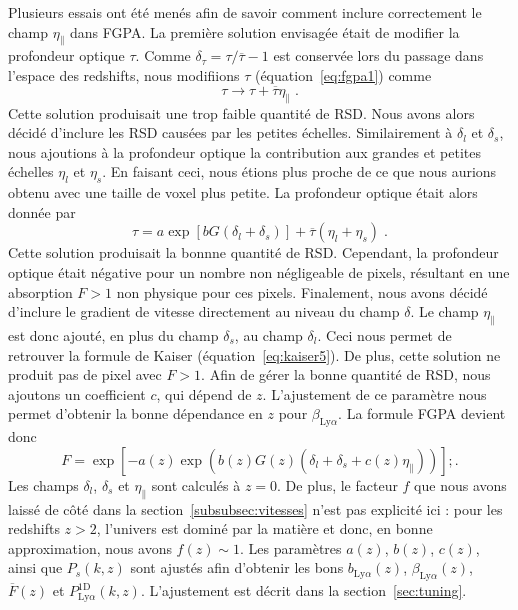 Plusieurs essais ont été menés afin de savoir comment inclure correctement le champ $\eta_{\parallel}$ dans FGPA.
La première solution envisagée était de modifier la profondeur optique $\tau$. Comme $\delta_{\tau} = \tau / \overline \tau - 1$ est conservée lors du passage dans l'espace des redshifts, nous modifiions $\tau$ (équation~\ref{eq:fgpa1}) comme
\begin{equation}
  \tau \rightarrow \tau + \overline \tau \eta_{\parallel} \; .
\end{equation}
Cette solution produisait une trop faible quantité de RSD. Nous avons alors décidé d'inclure les RSD causées par les petites échelles. Similairement à $\delta_l$ et $\delta_s$, nous ajoutions à la profondeur optique la contribution aux grandes et petites échelles $\eta_l$ et $\eta_s$. En faisant ceci, nous étions plus proche de ce que nous aurions obtenu avec une taille de voxel plus petite.
La profondeur optique était alors donnée par
\begin{equation}
  \tau = a \exp\left[b G (\delta_l + \delta_s)\right] + \overline \tau (\eta_l + \eta_s) \; .
\end{equation}
Cette solution produisait la bonnne quantité de RSD. Cependant, la profondeur optique était négative pour un nombre non négligeable de pixels, résultant en une absorption $F > 1$ non physique pour ces pixels.
Finalement, nous avons décidé d'inclure le gradient de vitesse directement au niveau du champ $\delta$.
Le champ $\eta_{\parallel}$ est donc ajouté, en plus du champ $\delta_s$, au champ $\delta_l$. Ceci nous permet de retrouver la formule de Kaiser (équation~\ref{eq:kaiser5}). De plus, cette solution ne produit pas de pixel avec $F > 1$.
Afin de gérer la bonne quantité de RSD, nous ajoutons un coefficient $c$, qui dépend de $z$. L'ajustement de ce paramètre nous permet d'obtenir la bonne dépendance en $z$ pour $\beta_{\mathrm{Ly}\alpha}$. La formule FGPA devient donc
\begin{equation}
  \label{eq:fgpa4}
  F = \exp\left[ - a(z) \exp(b(z) G(z) (\delta_l + \delta_s + c(z)\eta_{\parallel}))\right] ;.  
\end{equation}
Les champs $\delta_l$, $\delta_s$ et $\eta_{\parallel}$ sont calculés à $z=0$. De plus, le facteur $f$ que nous avons laissé de côté dans la section~\ref{subsubsec:vitesses} n'est pas explicité ici : pour les redshifts $z > 2$, l'univers est dominé par la matière et donc, en bonne approximation, nous avons $f(z) \sim 1$. Les paramètres $a(z)$, $b(z)$, $c(z)$, ainsi que $P_{s}(k,z)$ sont ajustés afin d'obtenir les bons $b_{\mathrm{Ly}\alpha}(z)$, $\beta_{\mathrm{Ly}\alpha}(z)$, $\overline F(z)$ et $P^{\mathrm{1D}}_{\mathrm{Ly}\alpha}(k,z)$. L'ajustement est décrit dans la section~\ref{sec:tuning}.


